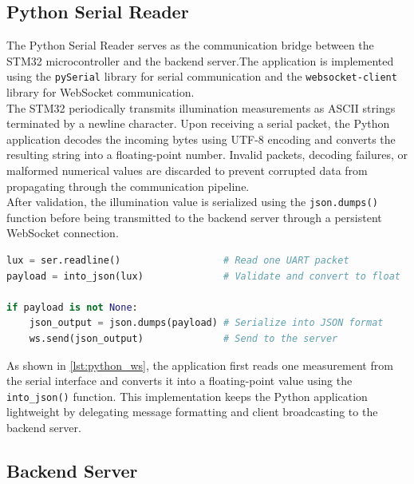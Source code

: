 \documentclass[11pt]{article}
\begin{document}
\subsection{Python Serial Reader}

The Python Serial Reader serves as the communication bridge between the STM32 microcontroller and the backend server.The application is implemented using the \texttt{pySerial} library for serial communication and the \texttt{websocket-client} library for WebSocket communication.\\[0.1em]

The STM32 periodically transmits illumination measurements as ASCII strings terminated by a newline character. Upon receiving a serial packet, the Python application decodes the incoming bytes using UTF-8 encoding and converts the resulting string into a floating-point number. Invalid packets, decoding failures, or malformed numerical values are discarded to prevent corrupted data from propagating through the communication pipeline.\\[0.1em]

After validation, the illumination value is serialized using the \texttt{json.dumps()} function before being transmitted to the backend server through a persistent WebSocket connection.

\begin{lstlisting}[language=Python,
caption={Transmission of validated sensor data to the backend server.},
label={lst:python_ws}]
lux = ser.readline()                  # Read one UART packet
payload = into_json(lux)              # Validate and convert to float

if payload is not None: 
    json_output = json.dumps(payload) # Serialize into JSON format
    ws.send(json_output)              # Send to the server
\end{lstlisting}

\vspace{0.5em}

As shown in \autoref{lst:python_ws}, the application first reads one measurement from the serial interface and converts it into a floating-point value using the \texttt{into\_json()} function. This implementation keeps the Python application lightweight by delegating message formatting and client broadcasting to the backend server.

\subsection{Backend Server}
\end{document}
